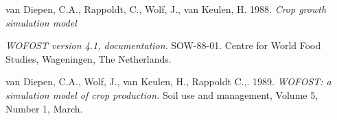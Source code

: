 van Diepen, C.A., Rappoldt, C., Wolf, J., van Keulen, H. 1988. {\it Crop growth simulation model}

{\it WOFOST version 4.1, documentation}. SOW-88-01. Centre for World
Food Studies, Wageningen, The Netherlands.

van Diepen, C.A., Wolf, J., van Keulen, H., Rappoldt C.,. 1989. {\it WOFOST: a simulation 
model of crop production.} Soil use and management, Volume 5, Number 1, March.

